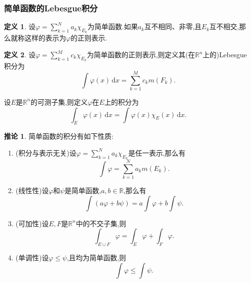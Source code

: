 \documentclass{ctexart}
\theoremstyle{definition}
\newtheorem{definition}{定义}
\newtheorem{corollary}{推论}
\theoremstyle{remark}
\begin{document}
	\subsubsection{简单函数的Lebesgue积分}
	\begin{definition}
		设$\varphi=\sum_{k=1}^N{a_k\chi_{E_k}}$为简单函数.如果$a_k$互不相同、非零,且$E_k$互不相交,那么就称这样的表示为$\varphi$的正则表示.
	\end{definition}
	\begin{definition}
		设$\varphi=\sum_{k=1}^M{c_k\chi_{E_k}}$为简单函数的正则表示,则定义其(在$\mathbb{R}^n$上的)Lebesgue积分为
		$$\int{\varphi(x)\,\mathrm{d}x}=\sum_{k=1}^M{c_km(F_k)}.$$
		
		设$E$是$\mathbb{R}^n$的可测子集,则定义$\varphi$在$E$上的积分为
		$$\int_E{\varphi(x)\,\mathrm{d}x}=\int{\varphi(x)\chi_E(x)\,\mathrm{d}x}.$$
	\end{definition}
	\begin{corollary}
		简单函数的积分有如下性质:
		\begin{enumerate}
			\item (积分与表示无关)设$\varphi=\sum_{k=1}^N{a_k\chi_{E_k}}$是任一表示,那么有
			$$\int{\varphi}=\sum_{k=1}^N{a_km(E_k)}.$$
			\item (线性性)设$\varphi$和$\psi$是简单函数,$a,b\in\mathbb{R}$,那么有
			$$\int{(a\varphi+b\psi)}=a\int{\varphi}+b\int{\psi}.$$
			\item (可加性)设$E,F$是$\mathbb{R}^n$中的不交子集,则
			$$\int_{E\cup F}{\varphi}=\int_E{\varphi}+\int_F{\varphi}.$$
			\item (单调性)设$\varphi\le\psi$,且均为简单函数,则
			$$\int{\varphi}\le\int{\psi}.$$
		\end{enumerate}
	\end{corollary}
	
\end{document}
